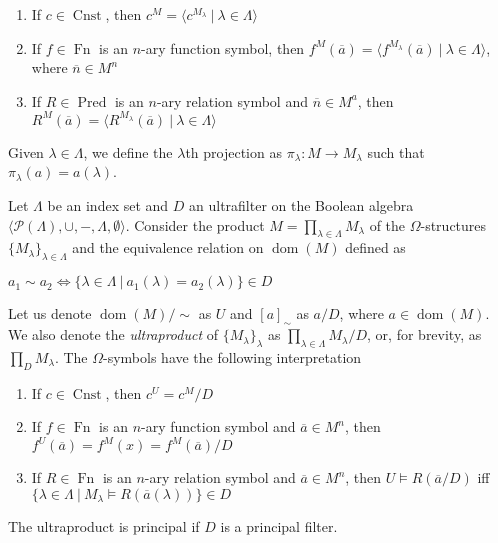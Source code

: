 \documentclass[a4paper]{article}
\theoremstyle{defin}
\theoremstyle{theorem}
\theoremstyle{prop}
\theoremstyle{lemma}
\theoremstyle{ex}
\theoremstyle{col}
\begin{document}
\begin{enumerate}
  \item If $c \in \operatorname{Cnst}$, then $c^{M} = \langle c^{M_{\lambda}} \: | \: \lambda \in \Lambda \rangle$
  \item If $f \in \operatorname{Fn}$ is an $n$-ary function symbol, then $f^{M}(\overline{a}) = \langle f^{M_{\lambda}}(\overline{a}) \: | \: \lambda \in \Lambda \rangle$, where $\overline{n} \in M^{n}$
  \item If $R \in \operatorname{Pred}$ is an $n$-ary relation symbol and $\overline{n} \in M^{a}$, then $R^{M}(\overline{a}) = \langle R^{M_{\lambda}}(\overline{a}) \: | \: \lambda \in \Lambda \rangle$
\end{enumerate}

Given $\lambda \in \Lambda$, we define the $\lambda$th projection as $\pi_{\lambda} : M \to M_{\lambda}$ such that $\pi_{\lambda}(a) = a(\lambda)$.

Let $\Lambda$ be an index set and $D$ an ultrafilter on the Boolean algebra $\langle \mathcal{P}(\Lambda), \cup, -, \Lambda, \emptyset \rangle$. Consider the product $M = \prod \limits_{\lambda \in \Lambda} M_{\lambda}$ of the $\Omega$-structures $\{ M_{\lambda}\}_{\lambda \in \Lambda}$ and the equivalence relation on $\operatorname{dom}(M)$ defined as
\begin{center}
  $a_1 \sim a_2 \Leftrightarrow \{ \lambda \in \Lambda \: | \: a_1(\lambda) = a_2(\lambda)\} \in D$
\end{center}
Let us denote $\operatorname{dom}(M) / \sim$ as $U$ and $[a]_{\sim}$ as $a / D$, where $a \in \operatorname{dom}(M)$. We also denote the \emph{ultraproduct} of $\{ M_{\lambda} \}_{\lambda}$ as $\prod \limits_{\lambda \in \Lambda} M_{\lambda} / D$, or,
for brevity, as $\prod_{D} M_{\lambda}$. The $\Omega$-symbols have the following interpretation
\begin{enumerate}
  \item If $c \in \operatorname{Cnst}$, then $c^{U} = c^{M} / D$
  \item If $f \in \operatorname{Fn}$ is an $n$-ary function symbol and $\overline{a} \in M^{n}$, then $f^{U}(\overline{a}) = f^{M}(x) = f^{M}(\overline{a}) / D$
  \item If $R \in \operatorname{Fn}$ is an $n$-ary relation symbol and $\overline{a} \in M^{n}$, then $U \models R(\overline{a} / D)$ iff
  $\{ \lambda \in \Lambda \: | \: M_{\lambda} \models R(\overline{a} (\lambda))\} \in D$
\end{enumerate}
The ultraproduct is principal if $D$ is a principal filter.
\end{document}
